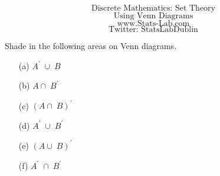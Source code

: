 \documentclass{beamer}
\begin{document}
\begin{frame}
\huge
\[ \mbox{Discrete Mathematics: Set Theory}\]
\[ \mbox{Using Venn Diagrams}\]
\Large
\[ \mbox{www.Stats-Lab.com}\]
\[ \mbox{Twitter: StatsLabDublin}\]
\end{frame}
\begin{frame}
\Large
Shade in the following areas on Venn diagrams.
\begin{itemize}
\item[(a)] $A^\prime\; \cup\; B$

\item[(b)] $A \cap\; B^\prime\;$

\item[(c)] $(A \cap\; B)^\prime\;$

\item[(d)] $A^\prime\; \cup\; B^\prime\;$

\item[(e)] $(A \cup\; B)^\prime\;$

\item[(f)] $A^\prime\; \cap\; B^\prime\;$

\end{itemize}
\end{frame}
\end{document}
